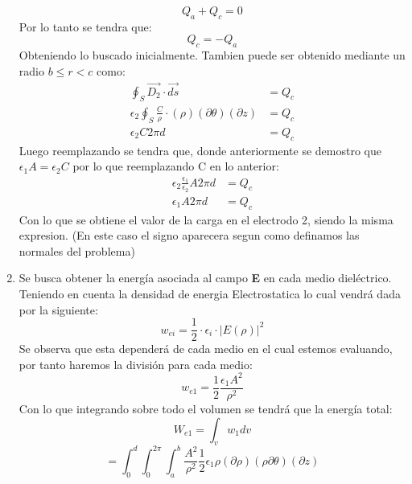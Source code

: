 \documentclass[
  11pt,
  letterpaper,
   addpoints,
   answers
  ]{exam}
\begin{document}
\begin{questions}
\begin{solution}
\begin{enumerate}
        \begin{equation}
            Q_{a} + Q_{c} = 0
        \end{equation}
        Por lo tanto se tendra que:
        \begin{equation}
            Q_{c} = -Q_{a}
        \end{equation}
        Obteniendo lo buscado inicialmente. Tambien puede ser obtenido mediante un radio $b \leq r < c$ como:
        \begin{align}
            \oint_{S} \vec{D_{2}} \cdot \vec{ds} &= Q_{c}\\  
            \epsilon_{2} \oint_{S} \frac{C}{\rho} \cdot (\rho) (\partial \theta) (\partial z) &= Q_{c}\\
            \epsilon_{2} C 2 \pi d &= Q_{c}
        \end{align}
        Luego reemplazando se tendra que, donde anteriormente se demostro que $\epsilon_{1}A = \epsilon_{2}C$ por lo que reemplazando C en lo anterior:
        \begin{align}
            \epsilon_{2} \frac{\epsilon_1}{\epsilon_2}A 2 \pi d &= Q_{c}\\
            \epsilon_{1} A 2 \pi d &= Q_{c}
        \end{align}
        Con lo que se obtiene el valor de la carga en el electrodo 2, siendo la misma expresion. (En este caso el signo aparecera segun como definamos las normales del problema)
        \item Se busca obtener la energía asociada al campo \textbf{E} en cada medio dieléctrico. Teniendo en cuenta la densidad de energia Electrostatica lo cual vendrá dada por la siguiente:
        \begin{equation}
            w_{ei} = \frac{1}{2}\cdot \epsilon_{i} \cdot |E(\rho)|^{2} 
        \end{equation}
        Se observa que esta dependerá de cada medio en el cual estemos evaluando, por tanto haremos la división para cada medio:
        \begin{equation}
            w_{e1} = \frac{1}{2}\frac{\epsilon_{1}A^{2}}{\rho^{2}}
        \end{equation}
        Con lo que integrando sobre todo el volumen se tendrá que la energía total:
        \begin{equation}
            W_{e1} =\int_{v} w_{1}dv
        \end{equation}
        \begin{equation}
            =\int_{0}^{d}  \int_{0}^{2\pi} \int_{a}^{b}\frac{A^{2}}{\rho^{2}} \frac{1}{2}\epsilon_{1} \rho(\partial\rho )(\rho \partial\theta)( \partial z)

\end{equation}
\end{enumerate}
\end{solution}
\end{questions}
\end{document}
